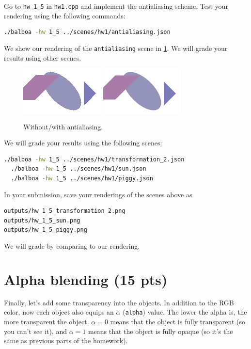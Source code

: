 Go to \lstinline{hw_1_5} in \lstinline{hw1.cpp} and implement the antialiasing scheme. Test your rendering using the following commands:
\begin{lstlisting}[language=bash]
  ./balboa -hw 1_5 ../scenes/hw1/antialiasing.json
\end{lstlisting}

We show our rendering of the \lstinline{antialiasing} scene in \cref{fig:hw1_5}. We will grade your results using other scenes.

\begin{figure}[ht]
    \centering
    \includegraphics[width=0.4\linewidth]{imgs/hw_1_5before.png}
    \includegraphics[width=0.4\linewidth]{imgs/hw_1_5after.png}
    \caption{Without/with antialiasing.}
    \label{fig:hw1_5}
\end{figure}

We will grade your results using the following scenes:
\begin{lstlisting}[language=bash]
  ./balboa -hw 1_5 ../scenes/hw1/transformation_2.json
  ./balboa -hw 1_5 ../scenes/hw1/sun.json
  ./balboa -hw 1_5 ../scenes/hw1/piggy.json
\end{lstlisting}
In your submission, save your renderings of the scenes above as
\begin{lstlisting}[language=bash]
outputs/hw_1_5_transformation_2.png
outputs/hw_1_5_sun.png
outputs/hw_1_5_piggy.png
\end{lstlisting}
We will grade by comparing to our rendering.

\section{Alpha blending (15 pts)}
Finally, let's add some transparency into the objects. In addition to the RGB color, now each object also equips an $\alpha$ (\lstinline{alpha}) value. The lower the alpha is, the more transparent the object. $\alpha=0$ means that the object is fully transparent (so you can't see it), and $\alpha=1$ means that the object is fully opaque (so it's the same as previous parts of the homework). 

